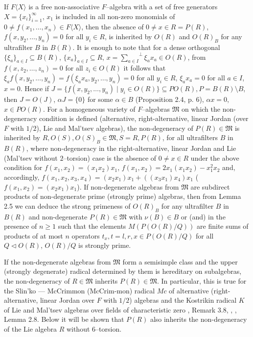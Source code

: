 \documentclass[a4paper,11pt]{article}
\begin{document}
If $F\langle X\rangle$ is a free non-associative $F$--algebra with a set of 
free generators ${X=\{x_i\}_{i=1}^{\infty}}$, $x_1$ is included in all 
non-zero monomials of ${0\ne f(x_1, \ldots, x_n)\in F\langle X\rangle}$, 
then the absence of ${0\ne x\in R=P(R)}$, ${f(x, y_2, \ldots, y_n)=0}$ 
for all ${y_i\in R}$, is inherited by $O(R)$ and $O(R)_B$ for any ultrafilter 
$B$ in $B(R)$. It is enough to note that for a dense orthogonal 
${\{\xi_a\}_{a\in I}\subseteq B(R)}$, ${\{x_a\}_{a\in I}\subseteq R}$, 
${x={\sum\limits_{a\in I}}^{\perp} \xi_a x_a\in O(R)}$, from  
${f(x, z_2, \ldots, z_n)=0}$ for all ${z_i\in O(R)}$ it follows that 
${\xi_a f(x, y_2, \ldots, y_n)=f(\xi_a x_a, y_2, \ldots, y_n)=0}$ for all 
${y_i\in R}$, ${\xi_a x_a=0}$ for all ${a\in I}$, ${x=0}$. Hence if 
${J=\{f(x, y_2, \ldots, y_n)\mid y_i\in O(R)\}\subseteq P O(R), 
P=B(R)\setminus B}$, then ${J=O(J)}$, ${\alpha J=\{0\}}$ for some 
${\alpha\in B}$ (Proposition 2.4, p. 6), ${\alpha x=0}$, 
${x\in P O(R)}$. For a homogeneous variety of $F$--algebras $\mathfrak{M}$ 
on which the non-degeneracy condition is defined 
(alternative, right-alternative, linear Jordan (over $F$ with $1/2$), 
Lie and Mal'tsev algebras), the non-degeneracy of ${P(R)\in \mathfrak{M}}$ 
is inherited by ${R, O(S), O(S)_B\in \mathfrak{M}, S=R, P(R)}$, for all ultrafilters $B$ in 
$B(R)$, where non-degeneracy in the right-alternative, linear Jordan and Lie 
(Mal'tsev without $2$--torsion) case is the absence of ${0\ne x\in R}$ under 
the above condition for ${f(x_1, x_2)=(x_1 x_2) x_1}$, 
$f(x_1, x_2)=2 x_1 (x_1 x_2)-x_1^2 x_2$ and, accordingly, 
${f(x_1, x_2, x_3, x_4)=(x_2 x_1) x_1+((x_3 x_1) x_4) x_1}$ 
($f(x_1, x_2)=(x_2 x_1) x_1$). If non-degenerate algebras from $\mathfrak{M}$ 
are subdirect products of non-degenerate prime (strongly prime) algebras, then 
from Lemma 2.5 we can deduce the strong primeness of $O(R)_B$ for any 
ultrafilter $B$ in $B(R)$ and non-degenerate ${P(R)\in \mathfrak{M}}$ with 
${\nu(B)\in B}$ or (and) in the presence of ${n\geq 1}$ such that the elements  
$M(P(O(R)/Q))$ are finite sums of products of at most $n$ operators 
${t_x, t=l, r, x\in P(O(R)/Q)}$ for all ${Q\lhd O(R)}$, 
$O(R)/Q$ is strongly prime.

If the non-degenerate algebras from $\mathfrak{M}$ form a semisimple class and 
the upper (strongly degenerate) radical determined by them is hereditary on 
subalgebras, the non-degeneracy of ${R\in \mathfrak{M}}$ 
inherits ${P(R)\in \mathfrak{M}}$. In particular, this is true for the 
Slin'ko --- McCrimmon (McCrim-\linebreak mon) radical $Mc$ of alternative 
(right-alternative, linear Jordan over $F$ with $1/2$) algebras and the 
Kostrikin radical $K$ of Lie and Mal'tsev algebras over fields of 
characteristic zero \cite{Gol10}, Remark 3.8, \cite{ZelM}, \cite{Gol5}, 
Lemma 2.8. Below it will be shown that $P(R)$ also inherits the 
non-degeneracy of the Lie algebra $R$ without $6$--torsion. 
\end{document}
